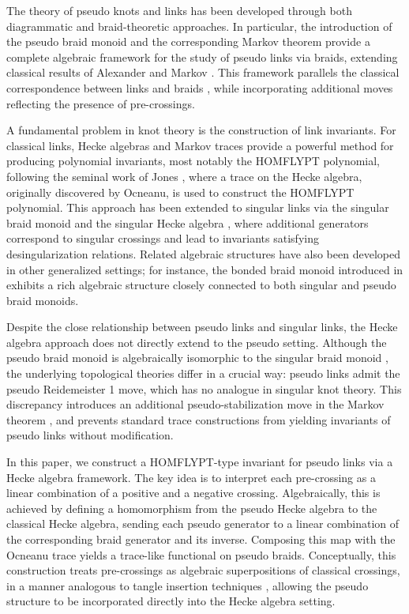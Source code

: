 \documentclass[11pt]{article}
\numberwithin{equation}{section}
\theoremstyle{definition}
\begin{document}
The theory of pseudo knots and links has been developed through both diagrammatic and braid-theoretic approaches. In particular, the introduction of the pseudo braid monoid \cite{BardakovJablanWang2016} and the corresponding Markov theorem \cite{BardakovJablanWang2016, D} provide a complete algebraic framework for the study of pseudo links via braids, extending classical results of Alexander \cite{Alexander1923} and Markov \cite{Markov1936}. This framework parallels the classical correspondence between links and braids \cite{Birman1993,Lambropoulou2007}, while incorporating additional moves reflecting the presence of pre-crossings.

A fundamental problem in knot theory is the construction of link invariants. For classical links, Hecke algebras and Markov traces provide a powerful method for producing polynomial invariants, most notably the HOMFLYPT polynomial, following the seminal work of Jones \cite{Jones1987}, where a trace on the Hecke algebra, originally discovered by Ocneanu, is used to construct the HOMFLYPT polynomial. This approach has been extended to singular links via the singular braid monoid and the singular Hecke algebra \cite{Baez1992,ParisRabenda2008}, where additional generators correspond to singular crossings and lead to invariants satisfying desingularization relations. Related algebraic structures have also been developed in other generalized settings; for instance, the bonded braid monoid introduced in \cite{DKL} exhibits a rich algebraic structure closely connected to both singular and pseudo braid monoids.


Despite the close relationship between pseudo links and singular links, the Hecke algebra approach does not directly extend to the pseudo setting. Although the pseudo braid monoid is algebraically isomorphic to the singular braid monoid \cite{BardakovJablanWang2016}, the underlying topological theories differ in a crucial way: pseudo links admit the pseudo Reidemeister 1 move, which has no analogue in singular knot theory. This discrepancy introduces an additional pseudo-stabilization move in the Markov theorem \cite{D, DiamantisPseudoST}, and prevents standard trace constructions from yielding invariants of pseudo links without modification.

In this paper, we construct a HOMFLYPT-type invariant for pseudo links via a Hecke algebra framework. The key idea is to interpret each pre-crossing as a linear combination of a positive and a negative crossing. Algebraically, this is achieved by defining a homomorphism from the pseudo Hecke algebra to the classical Hecke algebra, sending each pseudo generator to a linear combination of the corresponding braid generator and its inverse. Composing this map with the Ocneanu trace yields a trace-like functional on pseudo braids. Conceptually, this construction treats pre-crossings as algebraic superpositions of classical crossings, in a manner analogous to tangle insertion techniques \cite{HenrichKauffman2017}, allowing the pseudo structure to be incorporated directly into the Hecke algebra setting.
\end{document}
